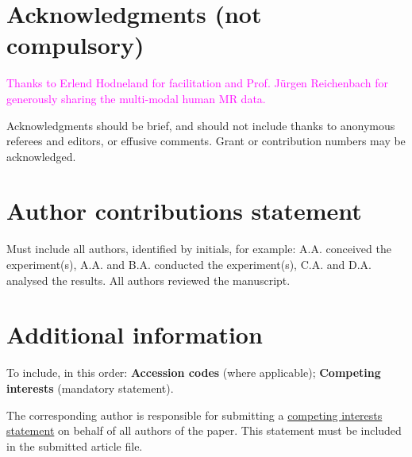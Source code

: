 \documentclass[fleqn,10pt]{wlscirep}
\newcommand{\mer}[1]{\textcolor{magenta}{#1}}
\begin{document}
\newpage
\section*{Acknowledgments (not compulsory)}

\mer{Thanks to Erlend Hodneland for facilitation and Prof. Jürgen
  Reichenbach for generously sharing the multi-modal human MR data.}

Acknowledgments should be brief, and should not include thanks to anonymous referees and editors, or effusive comments. Grant or contribution numbers may be acknowledged.

\section*{Author contributions statement}

Must include all authors, identified by initials, for example:
A.A. conceived the experiment(s),  A.A. and B.A. conducted the experiment(s), C.A. and D.A. analysed the results.  All authors reviewed the manuscript. 

\section*{Additional information}

To include, in this order: \textbf{Accession codes} (where applicable); \textbf{Competing interests} (mandatory statement). 

The corresponding author is responsible for submitting a \href{http://www.nature.com/srep/policies/index.html#competing}{competing interests statement} on behalf of all authors of the paper. This statement must be included in the submitted article file.

\newpage
\appendix



\end{document}
